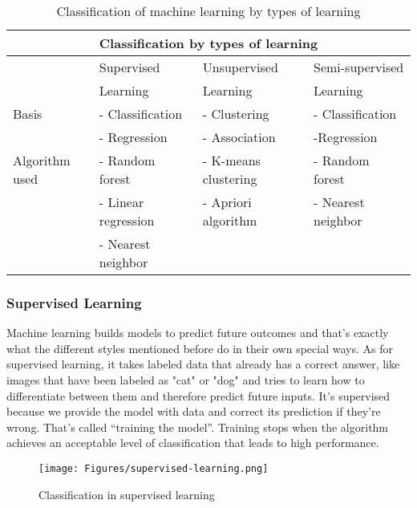 \begin{table}[hbt!]
\label{tab:Classification of machine learning by types of learning}
\centering
\begin{tabular}{ |l||l|l|l|  }
 \hline
 \multicolumn{4}{|c|}{Classification by types of learning} \\
 \hline
    &Supervised &Unsupervised &Semi-supervised \\
    &Learning&Learning&Learning\\
 \hline
 \hline
 Basis   & - Classification  &   - Clustering &  - Classification \\
  &- Regression & - Association & -Regression\\
 \hline
 Algorithm used & - Random forest  &  - K-means clustering   & - Random forest \\
  & - Linear regression & - Apriori algorithm & - Nearest neighbor\\
   & - Nearest neighbor & & \\
  \hline 
\end{tabular}
\caption{Classification of machine learning by types of learning}
\end{table}

\subsubsection{Supervised Learning}
Machine learning builds models to predict future outcomes and that's exactly what the different styles mentioned before do in their own special ways. As for supervised learning, it takes labeled data that already has a correct answer, like images that have been labeled as "cat" or "dog" and tries to learn how to differentiate between them and therefore predict future inputs. It's supervised because we provide the model with data and correct its prediction if they're wrong. That's called \enquote{training the model}. Training stops when the algorithm achieves an acceptable level of classification that leads to high performance\cite{7}.
\begin{figure}[H]
\centering
\texttt{[image: Figures/supervised-learning.png]}
\decoRule
\caption{Classification in supervised learning}
\label{fig:Classification in supervised learning}
\end{figure}

